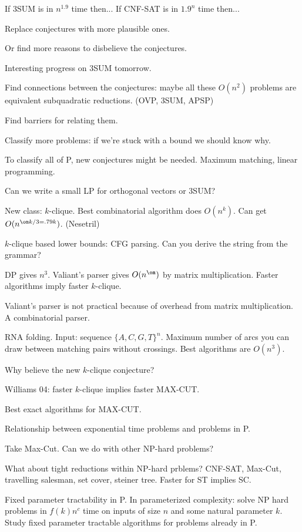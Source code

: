 If 3SUM is in $n^{1.9}$ time then... If CNF-SAT is in $1.9^n$ time then... 

Replace conjectures with more plausible ones. 

Or find more reasons to disbelieve the conjectures.

Interesting progress on 3SUM tomorrow. 

Find connections between the conjectures: maybe all these $O(n^2)$ problems are equivalent subquadratic reductions. (OVP, 3SUM, APSP)

Find barriers for relating them.

Classify more problems: if we're stuck with a bound we should know why.

To classify all of P, new conjectures might be needed. Maximum matching, linear programming.

Can we write a small LP for orthogonal vectors or 3SUM?

New class: $k$-clique. Best combinatorial algorithm does $O(n^k)$. Can get $O(n^{\om k/3=.79k})$. (Nesetril)

$k$-clique based lower bounds: CFG parsing. Can you derive the string from the grammar?

DP gives $n^3$.
Valiant's parser gives $O(n^\om)$ by matrix multiplication.
Faster algorithms imply faster $k$-clique.

Valiant's parser is not practical because of overhead from matrix multiplication.
A combinatorial parser.

RNA folding. Input: sequence $\{A,C,G,T\}^n$. Maximum number of arcs you can draw between matching pairs without crossings. Best algorithms are $O(n^3)$. 

Why believe the new $k$-clique conjecture?

Williams 04: faster $k$-clique implies faster MAX-CUT. 

Best exact algorithms for MAX-CUT.

Relationship between exponential time problems and problems in P.

Take Max-Cut. Can we do with other NP-hard problems?

What about tight reductions within NP-hard prblems? CNF-SAT, Max-Cut, travelling salesman, set cover, steiner tree. Faster for ST implies SC. 

Fixed parameter tractability in P. In parameterized complexity: solve NP hard problems in $f(k)n^c$ time  on inputs of size $n$ and some natural parameter $k$.
Study fixed parameter tractable algorithms for problems already in P.

